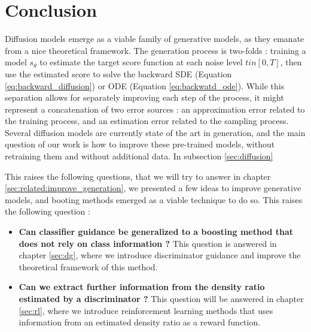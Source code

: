 \section{Conclusion}
Diffusion models emerge as a viable family of generative models, as they emanate from a nice theoretical framework. The generation process is two-folds : training a model $s_{\theta}$ to estimate the target score function at each noise level $t in [0,T]$, then use the estimated score to solve the backward SDE (Equation \ref{eq:backward_diffusion}) or ODE (Equation \ref{eq:backwatd_ode}). While this separation allows for separately improving each step of the process, it might represent a concatenation of two error sources : an approximation error related to the training process, and an estimation error related to the sampling process.
Several diffusion models are currently state of the art in generation, and the main question of our work is how to improve these pre-trained models, without retraining them and without additional data. In subsection \ref{sec:diffusion}

This raises the following questions, that we will try to answer in chapter \ref{sec:related:improve_generation}, we presented a few ideas to improve generative models, and booting methods emerged as a viable technique to do so. This raises the following question : 
\begin{itemize}
    \item \textbf{Can classifier guidance be generalized to a boosting method that does not rely on class information ?} This question is answered in chapter \ref{sec:dg}, where we introduce discriminator guidance \citep{kim2023refininggenerativeprocessdiscriminator} and improve the theoretical framework of this method.
    \item \textbf{Can we extract further information from the density ratio estimated by a discriminator ?} This question will be answered in chapter \ref{sec:rl}, where we introduce reinforcement learning methods that uses information from an estimated density ratio as a reward function. 
\end{itemize}
\label{sec:related:conclusion}


